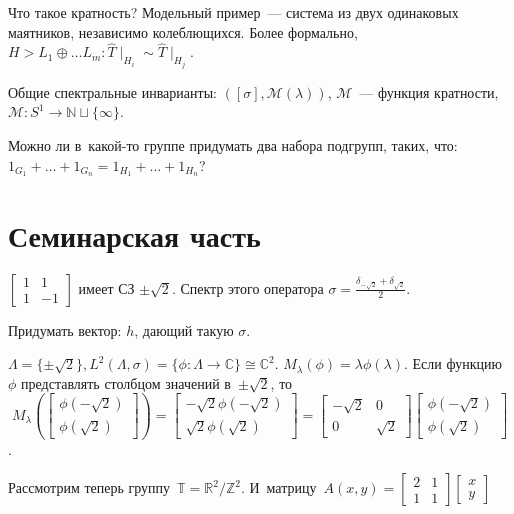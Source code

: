 \documentclass{article}
\begin{document}
Что такое кратность? Модельный пример~--- система из двух одинаковых маятников,
независимо колеблющихся. Более формально,
$H > L_1 \oplus \ldots L_m: \hat T\mid_{H_i} \sim \hat T\mid_{H_j}$.

Общие спектральные инварианты: $([\sigma], \mathcal{M}(\lambda))$,
$\mathcal{M}$~--- функция кратности, $\mathcal{M}: S^1 \rightarrow \mathbb{N}
\sqcup \{\infty\}$.

\begin{exercise}
	Можно ли в~какой-то группе придумать два набора подгрупп, таких, что:
	$1_{G_1} + \ldots + 1_{G_n} = 1_{H_1} + \ldots + 1_{H_n}$?
\end{exercise}

\section{Семинарская часть}

$\begin{bmatrix}1 & 1\\ 1 & -1\end{bmatrix}$ имеет СЗ $\pm\sqrt{2}$. Спектр
	этого оператора $\sigma = \frac{\delta_{-\sqrt{2}} + \delta_{\sqrt{2}}}{2}$.

\begin{exercise}[$\ast$]
	Придумать вектор: $h$, дающий такую $\sigma$.
\end{exercise}

$\Lambda = \{\pm \sqrt{2}\}, L^2(\Lambda, \sigma) = \{\phi: \Lambda \rightarrow
\mathbb{C} \} \cong \mathbb{C}^2$. $M_\lambda(\phi) = \lambda \phi(\lambda)$.
Если функцию $\phi$ представлять столбцом значений в~$\pm\sqrt{2}$, то
$$M_\lambda(\begin{bmatrix}\phi(-\sqrt{2})\\ \phi(\sqrt{2})\end{bmatrix}) =
\begin{bmatrix} -\sqrt{2}\phi(-\sqrt{2})\\ \sqrt{2}\phi(\sqrt{2}) \end{bmatrix}
= \begin{bmatrix} -\sqrt{2} & 0\\ 0 & \sqrt{2}\end{bmatrix}
	\begin{bmatrix}\phi(-\sqrt{2})\\ \phi(\sqrt{2})\end{bmatrix}$$.

Рассмотрим теперь группу~$\mathbb{T} = \mathbb{R}^2 / \mathbb{Z}^2$.
И~матрицу~$A(x, y) = \begin{bmatrix}2&1\\1&1\end{bmatrix}
	\begin{bmatrix}x\\y\end{bmatrix}$
\end{document}
